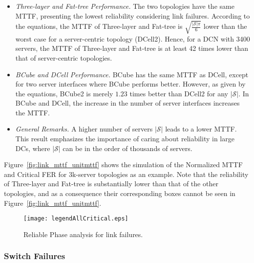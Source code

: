 \begin{itemize}
\item \textit{Three-layer and Fat-tree Performance.} The two topologies have the same MTTF, presenting the lowest reliability considering link failures. According to the equations, the MTTF of Three-layer and Fat-tree is $\sqrt{\frac{|\mathcal{S}|\pi}{6}}$ lower than the worst case for a server-centric topology (DCell2). Hence, for a DCN with 3400 servers, the MTTF of Three-layer and Fat-tree is at least 42 times lower than that of server-centric topologies.
\item \textit{BCube and DCell Performance.} BCube has the same MTTF as DCell, except for two server interfaces where BCube performs better. However, as given by the equations, BCube2 is merely $1.23$ times better than DCell2 for any $|\mathcal{S}|$. In BCube and DCell, the increase in the number of server interfaces increases the MTTF.
\item \textit{General Remarks.} A higher number of servers $|\mathcal{S}|$ leads to a lower MTTF. This result emphasizes the importance of caring about reliability in large DCs, where $|\mathcal{S}|$ can be in the order of thousands of servers.
\end{itemize}
Figure~\ref{fig:link_mttf_unitmttf} shows the simulation of the Normalized MTTF and Critical FER for 3k-server topologies as an example. 
Note that the reliability of Three-layer and Fat-tree is substantially lower than that of the other topologies, and as a consequence their corresponding boxes cannot be seen in Figure~\ref{fig:link_mttf_unitmttf}.
\begin{figure}
\centering
{}
{\texttt{[image: legendAllCritical.eps]}}
\caption{Reliable Phase analysis for link failures.}
\end{figure}
\subsubsection{Switch Failures}
\label{sec:perfEvaluationSwitchReliable}

